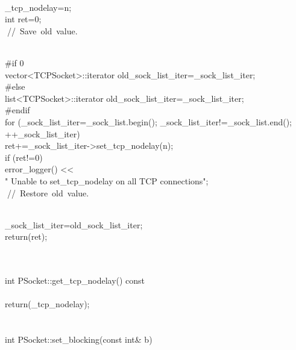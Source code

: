 \documentclass{article}
\begin{document}
 {
\\
     _tcp_nodelay=n;
\\
         int ret=0;
\\
         
\hbox{// Save old value.}\strut\\
 #if 0
\\
         vector<TCPSocket>::iterator old_sock_list_iter=_sock_list_iter;
\\
 #else
\\
         list<TCPSocket>::iterator old_sock_list_iter=_sock_list_iter;
\\
 #endif
\\
     for (_sock_list_iter=_sock_list.begin(); _sock_list_iter!=_sock_list.end();
\\
          ++_sock_list_iter)
\\
         ret+=_sock_list_iter->set_tcp_nodelay(n);
\\
     if (ret!=0)
\\
         error_logger() << 
\\
                                 "    Unable to set_tcp_nodelay on all TCP connections\n";
\\
         
\hbox{// Restore old value.}\strut\\
         _sock_list_iter=old_sock_list_iter;
\\
     return(ret);
\\
 }
\\
 
\\
 int PSocket::get_tcp_nodelay() const
\\
 {
\\
         return(_tcp_nodelay);
\\
 }
\\
 
\\
 int PSocket::set_blocking(const int& b)
\\
\end{document}
